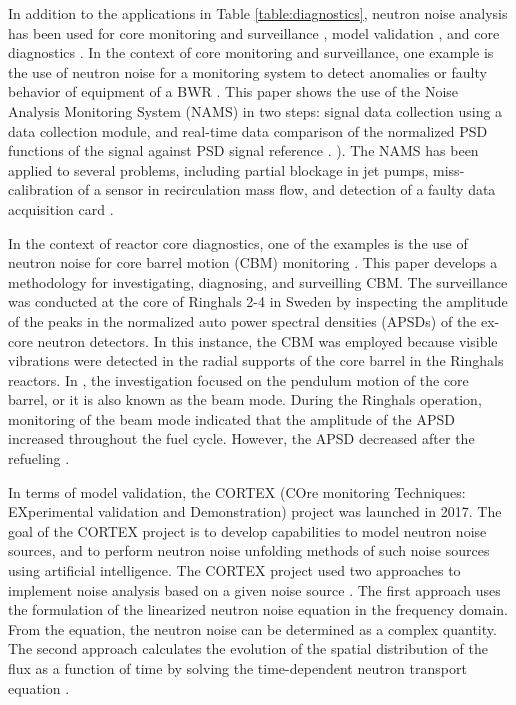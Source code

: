 In addition to the applications in Table \ref{table:diagnostics}, neutron noise analysis has been used for core monitoring and surveillance \cite{czibokRegularNeutronNoise2003, hashemianOnlineMonitoringApplications2011, hashemianMeasurementDynamicTemperatures2011, hashemianPracticalReviewMethods2010, montalvoAdvancedSurveillanceResistance2014, ortiz-villafuerteBWROnlineMonitoring2006}, model validation \cite{demaziereCORTEXProjectImproving2020}, and core diagnostics \cite{pazsitDevelopmentsCoreBarrelMotion2016, montalvoFirstEvidencePivotal2016, torresNeutronNoiseAnalysis2019}. In the context of core monitoring and surveillance, one example is the use of neutron noise for a monitoring system to detect anomalies or faulty behavior of equipment of a BWR \cite{ortiz-villafuerteBWROnlineMonitoring2006}. This paper shows the use of the Noise Analysis Monitoring System (NAMS) in two steps: signal data collection using a data collection module, and real-time data comparison of the normalized PSD functions of the signal against PSD signal reference \cite{ortiz-villafuerteBWROnlineMonitoring2006}. ). The NAMS has been applied to several problems, including partial blockage in jet pumps, miss-calibration of a sensor in recirculation mass flow, and detection of a faulty data acquisition card \cite{ortiz-villafuerteBWROnlineMonitoring2006}.

In the context of reactor core diagnostics, one of the examples is the use of neutron noise for core barrel motion (CBM) monitoring \cite{pazsitDevelopmentsCoreBarrelMotion2016}. This paper develops a methodology for investigating, diagnosing, and surveilling CBM. The surveillance was conducted at the core of Ringhals 2-4 in Sweden by inspecting the amplitude of the peaks in the normalized auto power spectral densities (APSDs) of the ex-core neutron detectors. In this instance, the CBM was employed because visible vibrations were detected in the radial supports of the core barrel in the Ringhals reactors. In \cite{martinSurveillanceDiagnosticsBeam2012}, the investigation focused on the pendulum motion of the core barrel, or it is also known as the beam mode. During the Ringhals operation, monitoring of the beam mode indicated that the amplitude of the APSD increased throughout the fuel cycle. However, the APSD decreased after the refueling \cite{pazsitFinalReportResearch2011}. 

In terms of model validation, the CORTEX (COre monitoring Techniques: EXperimental validation and Demonstration) project was launched in 2017. The goal of the CORTEX project is to develop capabilities to model neutron noise sources, and to perform neutron noise unfolding methods of such noise sources using artificial intelligence. The CORTEX project used two approaches to implement noise analysis based on a given noise source \cite{demaziereCORTEXProjectImproving2020}. The first approach uses the formulation of the linearized neutron noise equation in the frequency domain. From the equation, the neutron noise can be determined as a complex quantity. The second approach calculates the evolution of the spatial distribution of the flux as a function of time by solving the time-dependent neutron transport equation \cite{brighentiDevelopmentValidationTimedependent2022, hursinModelingNoiseExperiments2023}. 

